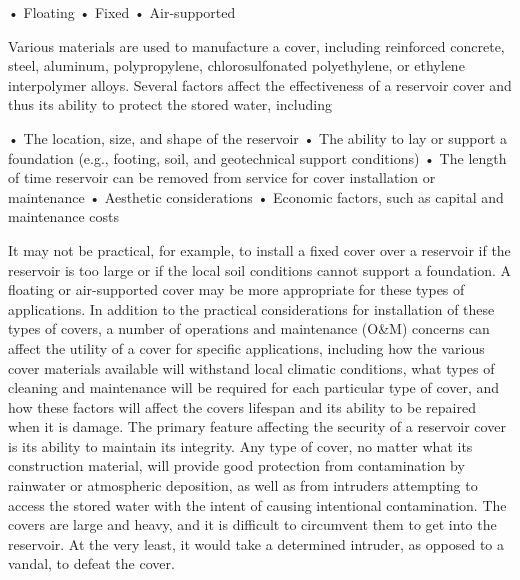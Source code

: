 \documentclass{article}
\begin{document}
• Floating • Fixed • Air-supported

Various materials are used to manufacture a cover, including reinforced
concrete, steel, aluminum, polypropylene, chlorosulfonated polyethylene,
or ethylene interpolymer alloys. Several factors affect the
effectiveness of a reservoir cover and thus its ability to protect the
stored water, including

• The location, size, and shape of the reservoir • The ability to lay or
support a foundation (e.g., footing, soil, and geotechnical support
conditions) • The length of time reservoir can be removed from service
for cover installation or maintenance • Aesthetic considerations •
Economic factors, such as capital and maintenance costs

It may not be practical, for example, to install a fixed cover over a
reservoir if the reservoir is too large or if the local soil conditions
cannot support a foundation. A floating or air-supported cover may be
more appropriate for these types of applications. In addition to the
practical considerations for installation of these types of covers, a
number of operations and maintenance (O\&M) concerns can affect the
utility of a cover for specific applications, including how the various
cover materials available will withstand local climatic conditions, what
types of cleaning and maintenance will be required for each particular
type of cover, and how these factors will affect the covers lifespan and
its ability to be repaired when it is damage. The primary feature
affecting the security of a reservoir cover is its ability to maintain
its integrity. Any type of cover, no matter what its construction
material, will provide good protection from contamination by rainwater
or atmospheric deposition, as well as from intruders attempting to
access the stored water with the intent of causing intentional
contamination. The covers are large and heavy, and it is difficult to
circumvent them to get into the reservoir. At the very least, it would
take a determined intruder, as opposed to a vandal, to defeat the cover.
\end{document}
